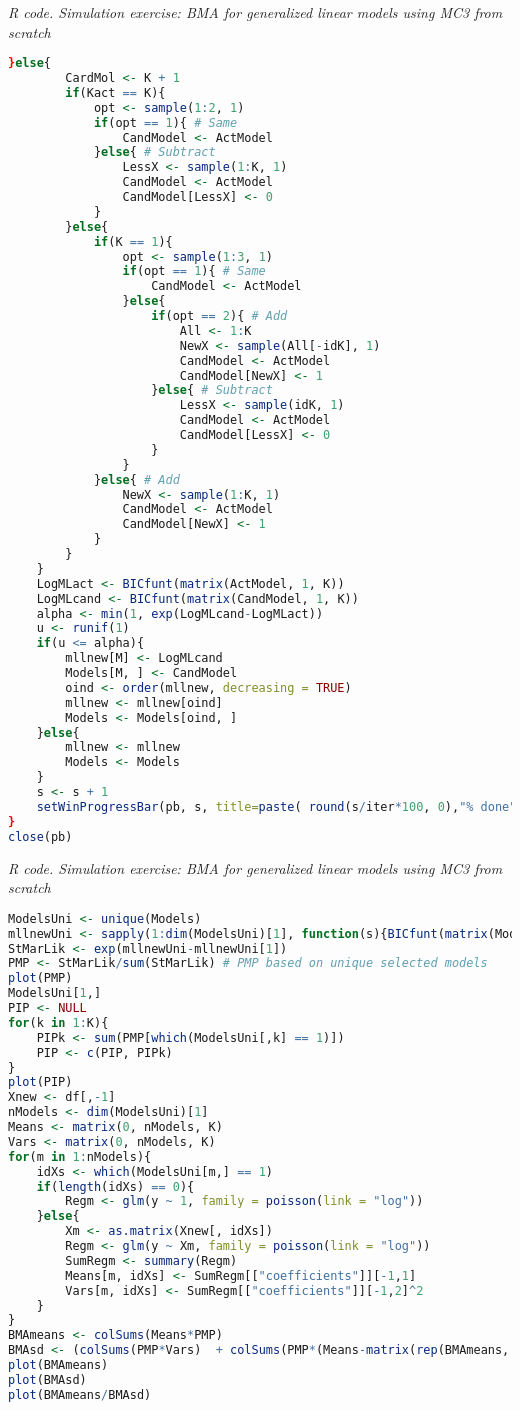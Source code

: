 \begin{tcolorbox}[enhanced,width=4.67in,center upper,
	fontupper=\large\bfseries,drop shadow southwest,sharp corners]
	\textit{R code. Simulation exercise: BMA for generalized linear models using MC3 from scratch}
	\begin{VF}
		\begin{lstlisting}[language=R]
	}else{
		CardMol <- K + 1
		if(Kact == K){
			opt <- sample(1:2, 1)
			if(opt == 1){ # Same
				CandModel <- ActModel
			}else{ # Subtract
				LessX <- sample(1:K, 1)
				CandModel <- ActModel
				CandModel[LessX] <- 0
			}
		}else{
			if(K == 1){
				opt <- sample(1:3, 1)
				if(opt == 1){ # Same
					CandModel <- ActModel
				}else{
					if(opt == 2){ # Add
						All <- 1:K
						NewX <- sample(All[-idK], 1)
						CandModel <- ActModel
						CandModel[NewX] <- 1
					}else{ # Subtract
						LessX <- sample(idK, 1)
						CandModel <- ActModel
						CandModel[LessX] <- 0
					}
				}
			}else{ # Add
				NewX <- sample(1:K, 1)
				CandModel <- ActModel
				CandModel[NewX] <- 1
			}
		}
	}
	LogMLact <- BICfunt(matrix(ActModel, 1, K))
	LogMLcand <- BICfunt(matrix(CandModel, 1, K))
	alpha <- min(1, exp(LogMLcand-LogMLact))
	u <- runif(1)
	if(u <= alpha){
		mllnew[M] <- LogMLcand
		Models[M, ] <- CandModel
		oind <- order(mllnew, decreasing = TRUE)
		mllnew <- mllnew[oind]
		Models <- Models[oind, ]
	}else{
		mllnew <- mllnew
		Models <- Models
	}
	s <- s + 1
	setWinProgressBar(pb, s, title=paste( round(s/iter*100, 0),"% done"))
}
close(pb)
\end{lstlisting}
	\end{VF}
\end{tcolorbox}   
 
\begin{tcolorbox}[enhanced,width=4.67in,center upper,
	fontupper=\large\bfseries,drop shadow southwest,sharp corners]
	\textit{R code. Simulation exercise: BMA for generalized linear models using MC3 from scratch}
	\begin{VF}
		\begin{lstlisting}[language=R]
ModelsUni <- unique(Models)
mllnewUni <- sapply(1:dim(ModelsUni)[1], function(s){BICfunt(matrix(ModelsUni[s,], 1, K))})
StMarLik <- exp(mllnewUni-mllnewUni[1])
PMP <- StMarLik/sum(StMarLik) # PMP based on unique selected models
plot(PMP)
ModelsUni[1,]
PIP <- NULL
for(k in 1:K){
	PIPk <- sum(PMP[which(ModelsUni[,k] == 1)])
	PIP <- c(PIP, PIPk)
}
plot(PIP)
Xnew <- df[,-1]
nModels <- dim(ModelsUni)[1]
Means <- matrix(0, nModels, K)
Vars <- matrix(0, nModels, K)
for(m in 1:nModels){
	idXs <- which(ModelsUni[m,] == 1)
	if(length(idXs) == 0){
		Regm <- glm(y ~ 1, family = poisson(link = "log"))
	}else{
		Xm <- as.matrix(Xnew[, idXs])
		Regm <- glm(y ~ Xm, family = poisson(link = "log"))
		SumRegm <- summary(Regm)
		Means[m, idXs] <- SumRegm[["coefficients"]][-1,1]
		Vars[m, idXs] <- SumRegm[["coefficients"]][-1,2]^2 
	}
}
BMAmeans <- colSums(Means*PMP)
BMAsd <- (colSums(PMP*Vars)  + colSums(PMP*(Means-matrix(rep(BMAmeans, each = nModels), nModels, K))^2))^0.5 
plot(BMAmeans)
plot(BMAsd)
plot(BMAmeans/BMAsd)
\end{lstlisting}
	\end{VF}
\end{tcolorbox}   
 



